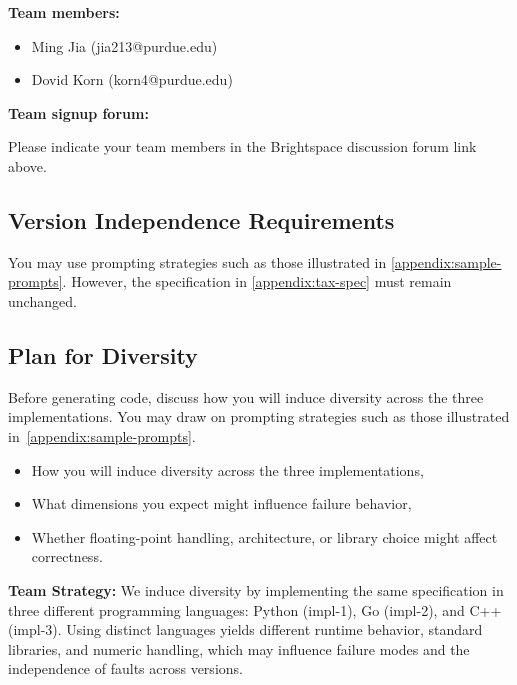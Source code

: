 \begin{tcolorbox}[colback=purple!10,colframe=purple!70!black,boxrule=0.5pt]
\textbf{Team members:}  
\begin{itemize}
    \item Ming Jia (jia213@purdue.edu)
    \item Dovid Korn (korn4@purdue.edu)
\end{itemize}
\textbf{Team signup forum:} \labTwoForumLink\par
Please indicate your team members in the Brightspace discussion forum link above.
\end{tcolorbox}

\subsection{Version Independence Requirements}



You may use prompting strategies such as those illustrated in \cref{appendix:sample-prompts}.
However, the specification in \cref{appendix:tax-spec} must remain unchanged.

\subsection{Plan for Diversity}

Before generating code, discuss how you will induce diversity across the three implementations.
You may draw on prompting strategies such as those illustrated in~\cref{appendix:sample-prompts}.


\begin{itemize}
  \item How you will induce diversity across the three implementations,
  \item What dimensions you expect might influence failure behavior,
  \item Whether floating-point handling, architecture, or library choice might affect correctness.
\end{itemize}

\begin{tcolorbox}[colback=purple!10,colframe=purple!70!black,boxrule=0.5pt]
\textbf{Team Strategy:}  
We induce diversity by implementing the same specification in three different programming languages: Python (impl-1), Go (impl-2), and C++ (impl-3).
Using distinct languages yields different runtime behavior, standard libraries, and numeric handling, which may influence failure modes and the independence of faults across versions.
\end{tcolorbox}

